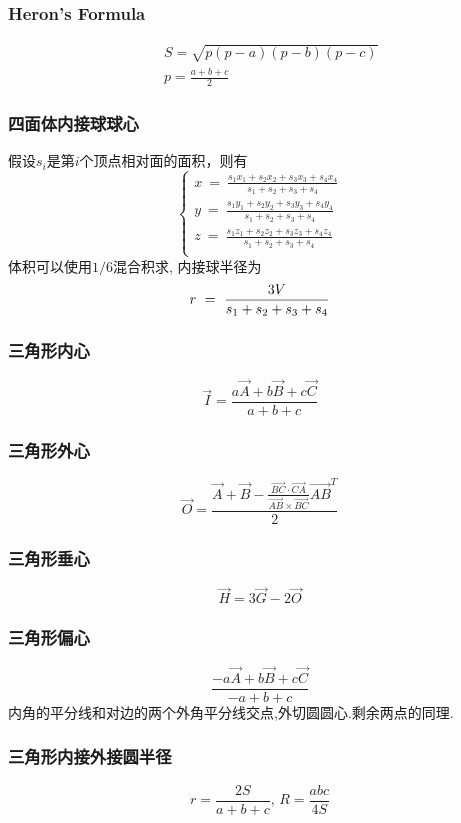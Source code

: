 \begin{small}
\begin{spacing}{0.5}
\begin{multicols*}{2}
    \subsubsection{Heron's Formula}
    \begin{eqnarray*}
        && S=\sqrt{p(p-a)(p-b)(p-c)} \\
        && p=\frac{a+b+c}{2}
    \end{eqnarray*}
\subsubsection{四面体内接球球心}
假设$s_i$是第$i$个顶点相对面的面积，则有
\[\left\{
\begin{aligned}
x \ = \ \frac{s_1x_1+s_2x_2+s_3x_3+s_4x_4}{s_1+s_2+s_3+s_4}\\
y \ = \ \frac{s_1y_1+s_2y_2+s_3y_3+s_4y_4}{s_1+s_2+s_3+s_4}\\
z \ = \ \frac{s_1z_1+s_2z_2+s_3z_3+s_4z_4}{s_1+s_2+s_3+s_4}\\
\end{aligned}\right.\]
体积可以使用$1/6$混合积求, 内接球半径为
\[
r \ = \ \frac{3V}{s_1+s_2+s_3+s_4} \\
\]
\subsubsection{三角形内心}
    \[ \vec{I} = \frac{a\vec {A} + b\vec{B} + c\vec{C}}{a + b + c} \]
\subsubsection{三角形外心}
    \[ \vec{O} = \frac{\vec{A} + \vec{B} - \frac{\overrightarrow {BC} \cdot \overrightarrow{CA}}{\overrightarrow {AB} \times \overrightarrow{BC}}\overrightarrow {AB}^T}{2} \]
\subsubsection{三角形垂心}
    \[ \vec{H} = 3\vec{G} - 2\vec{O} \]
\subsubsection{三角形偏心}
    \[ \frac{-a\vec {A} + b\vec{B} + c\vec{C}}{-a + b + c} \]
    内角的平分线和对边的两个外角平分线交点,外切圆圆心.剩余两点的同理. 
\subsubsection{三角形内接外接圆半径}
    \[ r=\frac{2S}{a+b+c},\, R=\frac{abc}{4S} \]
\end{multicols*}

\end{spacing}
\end{small}
